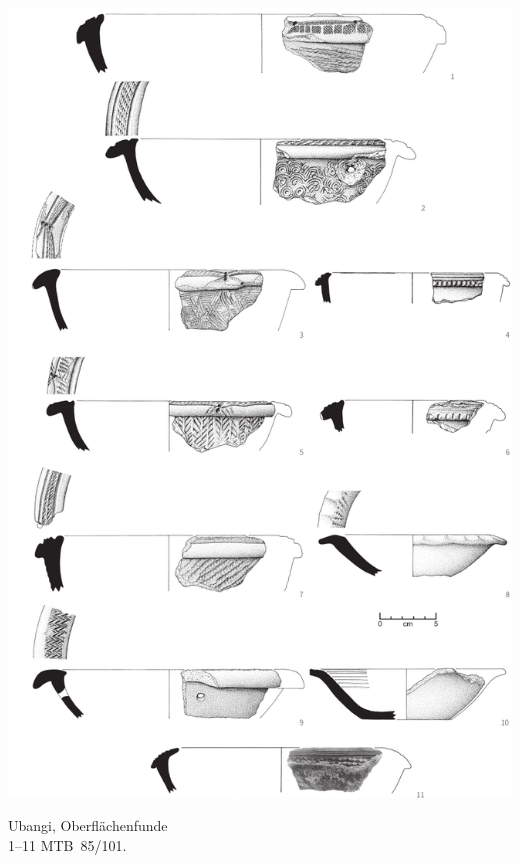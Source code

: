 \begin{pl}[H]
	\includegraphics{plt/Taf14.pdf}
	\vspace{.75em}\caption{\mbox{Ubangi}, Oberflächenfunde \\ 1--11 MTB~85/101.}
	\label{pl:14}
\end{pl}

